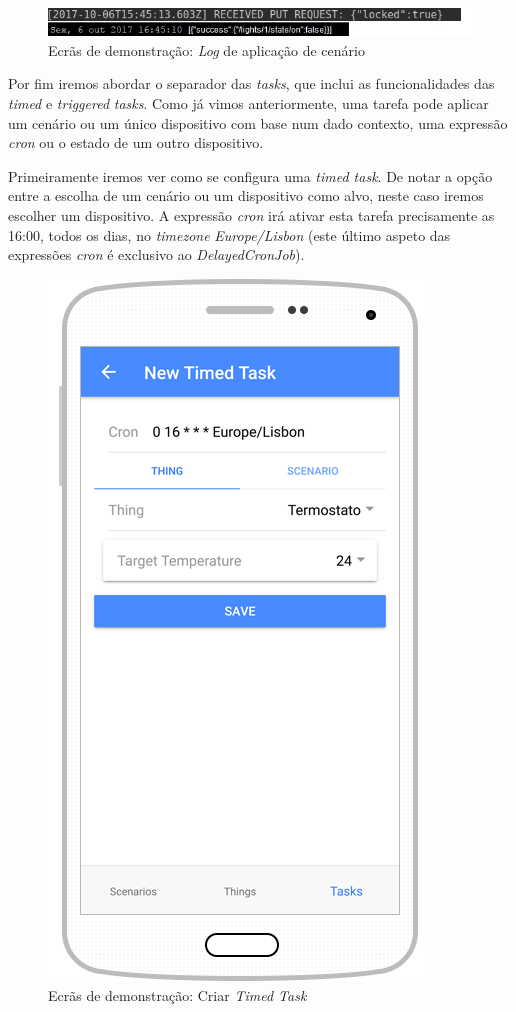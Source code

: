 \begin{figure}[H]
  \centering
        \includegraphics[scale=0.6]{img/demo/scenario_apply_log.jpg}
  \caption{Ecrãs de demonstração: \textit{Log} de aplicação de cenário}
\end{figure}

Por fim iremos abordar o separador das \textit{tasks}, que inclui as funcionalidades das \textit{timed} e \textit{triggered} \textit{tasks}. Como já vimos anteriormente, uma tarefa pode aplicar um cenário ou um único dispositivo com base num dado contexto, uma expressão \textit{cron} ou o estado de um outro dispositivo.

Primeiramente iremos ver como se configura uma \textit{timed task}. De notar a opção entre a escolha de um cenário ou um dispositivo como alvo, neste caso iremos escolher um dispositivo. A expressão \textit{cron} irá ativar esta tarefa precisamente as 16:00, todos os dias, no \textit{timezone} \textit{Europe/Lisbon} (este último aspeto das expressões \textit{cron} é exclusivo ao \textit{DelayedCronJob}). 

\begin{figure}[H]
  \centering
        \includegraphics[scale=0.6]{img/demo/new_timed_task.png}
  \caption{Ecrãs de demonstração: Criar \textit{Timed Task}}
\end{figure}

